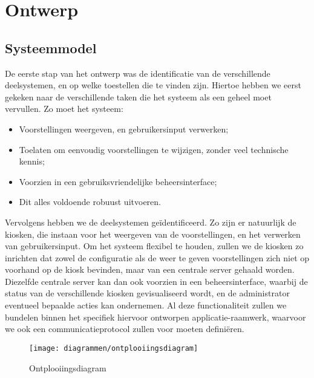\part{Ontwerp}
\label{part:ontwerp}

%
%

\chapter{Systeemmodel}
\label{chap:systeemmodel}

De eerste stap van het ontwerp was de identificatie van de verschillende deelsystemen, en op welke toestellen die te vinden zijn. Hiertoe hebben we eerst gekeken naar de verschillende taken die het systeem als een geheel moet vervullen. Zo moet het systeem:
\begin{itemize}
\item Voorstellingen weergeven, en gebruikersinput verwerken;
\item Toelaten om eenvoudig voorstellingen te wijzigen, zonder veel technische kennis;
\item Voorzien in een gebruiksvriendelijke beheersinterface;
\item Dit alles voldoende robuust uitvoeren.
\end{itemize}

Vervolgens hebben we de deelsystemen geïdentificeerd. Zo zijn er natuurlijk de kiosken, die instaan voor het weergeven van de voorstellingen, en het verwerken van gebruikersinput. Om het systeem flexibel te houden, zullen we de kiosken zo inrichten dat zowel de configuratie als de weer te geven voorstellingen zich niet op voorhand op de kiosk bevinden, maar van een centrale server gehaald worden. Diezelfde centrale server kan dan ook voorzien in een beheersinterface, waarbij de status van de verschillende kiosken gevisualiseerd wordt, en de administrator eventueel bepaalde acties kan ondernemen. Al deze functionaliteit zullen we bundelen binnen het specifiek hiervoor ontworpen applicatie-raamwerk, waarvoor we ook een communicatieprotocol zullen voor moeten definiëren.


\begin{figure}
	\texttt{[image: diagrammen/ontplooiingsdiagram]}
	\caption{Ontplooiingsdiagram}
\end{figure}

